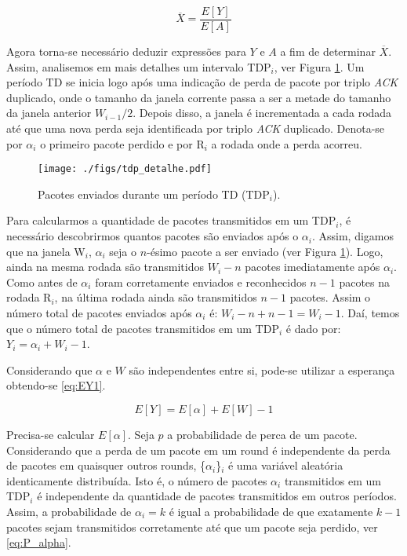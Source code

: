 \begin{equation} \label{eq:throughput}
\overline{X}=\frac{E[Y]}{E[A]}
\end{equation}

Agora torna-se necessário deduzir expressões para $Y$ e $A$ a fim de determinar $\overline{X}$. Assim, 
analisemos em mais detalhes um intervalo TDP$_i$, ver Figura \ref{fig:tdp_detalhe}.
Um período TD se inicia logo após uma indicação de perda de pacote por triplo \textit{ACK} duplicado, 
onde o tamanho da janela corrente passa a ser a metade do tamanho da janela anterior $W_{i-1} / 2$. 
Depois disso, a janela é incrementada a cada rodada até que uma nova perda seja identificada por triplo 
\textit{ACK} duplicado. Denota-se por $\alpha_i$ o primeiro pacote perdido e por R$_i$ a rodada onde a 
perda acorreu. 

\begin{figure}[ht]
  \centering
  \texttt{[image: ./figs/tdp\_detalhe.pdf]}
  \caption{Pacotes enviados durante um período TD (TDP$_{i}$).}
  \label{fig:tdp_detalhe}
\end{figure}

Para calcularmos a quantidade de pacotes transmitidos em um TDP$_i$, é necessário descobrirmos quantos pacotes
são enviados após o $\alpha_i$. Assim, digamos que na janela W$_i$, $\alpha_i$ seja o $n$-ésimo pacote a ser
enviado (ver Figura \ref{fig:tdp_detalhe}). Logo, ainda na mesma rodada  são transmitidos $W_i - n$ pacotes 
imediatamente após $\alpha_i$. Como antes de $\alpha_i$ foram corretamente enviados e reconhecidos $n - 1$ pacotes 
na rodada R$_i$, na última rodada ainda são transmitidos $n - 1$ pacotes. Assim o número total de pacotes enviados
após $\alpha_i$ é: $W_i - n + n -1 = W_i - 1$. Daí, temos que o número total de pacotes transmitidos em um
TDP$_i$ é dado por: $Y_i = \alpha_i + W_i - 1$. 

Considerando que $\alpha$ e $W$ são independentes entre si,
pode-se utilizar a esperança obtendo-se \eqref{eq:EY1}.

\begin{equation} \label{eq:EY1}
E[Y]=E[\alpha] + E[W] - 1
\end{equation}

Precisa-se calcular $E[\alpha]$. Seja $p$ a probabilidade de perca de um pacote. Considerando que a perda 
de um pacote em um round é independente da perda de pacotes em quaisquer outros rounds, \{$\alpha_i$\}$_i$ 
é uma variável aleatória identicamente distribuída. Isto é, o número de pacotes $\alpha_i$ transmitidos 
em um TDP$_i$ é independente da quantidade de pacotes transmitidos em outros períodos. Assim, a 
probabilidade de $\alpha_i = k$ é igual a probabilidade de que exatamente $k - 1$ pacotes sejam 
transmitidos corretamente até que um pacote seja perdido, ver \eqref{eq:P_alpha}.

